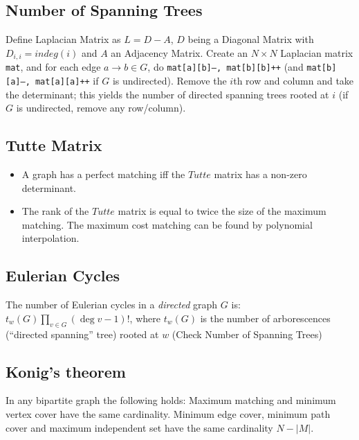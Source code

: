 \subsection{Number of Spanning Trees}
	Define Laplacian Matrix as $L = D - A$, $D$ being a Diagonal Matrix with $D_{i,i} = indeg(i)$ and $A$ an Adjacency Matrix.
	Create an $N\times N$ Laplacian matrix \texttt{mat}, and for each edge $a \rightarrow b \in G$, do
	\texttt{mat[a][b]--, mat[b][b]++} (and \texttt{mat[b][a]--, mat[a][a]++} if $G$ is undirected).
	Remove the $i$th row and column and take the determinant; this yields the number of directed spanning trees rooted at $i$
	(if $G$ is undirected, remove any row/column).

\subsection{Tutte Matrix}
	\begin{itemize}
	\item A graph has a perfect matching iff the $Tutte$ matrix has a non-zero determinant.
	\item The rank of the $Tutte$ matrix is equal to twice the size of the maximum matching. The maximum cost matching can be found by polynomial interpolation.
	\end{itemize}

\subsection{Eulerian Cycles}
The number of Eulerian cycles in a \emph{directed} graph $G$ is: $t_w(G) \prod_{v \in G} (\deg v - 1)!$,
where $t_w(G)$ is the number of arborescences (``directed spanning'' tree) rooted at $w$
(Check Number of Spanning Trees)


\subsection{Konig's theorem}
In any bipartite graph the following holds: Maximum matching and minimum vertex cover have the same cardinality.
Minimum edge cover, minimum path cover and maximum independent set have the same cardinality $N - |M|$.



